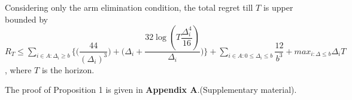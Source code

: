 
\begin{proposition}
Considering only the arm elimination condition, the total regret till $T$ is upper bounded by $R_{T}\leq \sum_{i\in A:\Delta_{i}\geq b}\bigg \lbrace \bigg(\dfrac{44}{(\Delta_{i})^{3}}\bigg) + \bigg(\Delta_{i}+\dfrac{32\log{(T\dfrac{\Delta_{i}^{4}}{16})}}{\Delta_{i}}\bigg)\bigg\rbrace + \sum_{i\in A:0\leq\Delta_{i}\leq b}\dfrac{12}{b^{3}} + max_{i:\Delta\leq b}\Delta_{i}T$, where $T$ is the horizon.
\end{proposition}

	The proof of Proposition 1 is given in \textbf{Appendix A}.(Supplementary material).

\begin{remark}
	

\end{remark}
